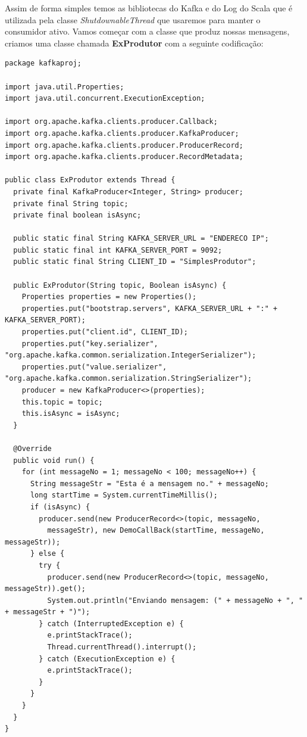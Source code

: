 \documentclass[a4paper,11pt]{article}
\begin{document}
Assim de forma simples temos as bibliotecas do Kafka e do Log do Scala que é utilizada pela classe \textit{ShutdownableThread} que usaremos para manter o consumidor ativo. Vamos começar com a classe que produz nossas mensagens, criamos uma classe chamada \textbf{ExProdutor} com a seguinte codificação:
\begin{lstlisting}[]
package kafkaproj;

import java.util.Properties;
import java.util.concurrent.ExecutionException;

import org.apache.kafka.clients.producer.Callback;
import org.apache.kafka.clients.producer.KafkaProducer;
import org.apache.kafka.clients.producer.ProducerRecord;
import org.apache.kafka.clients.producer.RecordMetadata;
 
public class ExProdutor extends Thread {
  private final KafkaProducer<Integer, String> producer;
  private final String topic;
  private final boolean isAsync;
 
  public static final String KAFKA_SERVER_URL = "ENDERECO IP";
  public static final int KAFKA_SERVER_PORT = 9092;
  public static final String CLIENT_ID = "SimplesProdutor";
 
  public ExProdutor(String topic, Boolean isAsync) {
    Properties properties = new Properties();
    properties.put("bootstrap.servers", KAFKA_SERVER_URL + ":" + KAFKA_SERVER_PORT);
    properties.put("client.id", CLIENT_ID);
    properties.put("key.serializer", "org.apache.kafka.common.serialization.IntegerSerializer");
    properties.put("value.serializer", "org.apache.kafka.common.serialization.StringSerializer");
    producer = new KafkaProducer<>(properties);
    this.topic = topic;
    this.isAsync = isAsync;
  }
 
  @Override
  public void run() {
    for (int messageNo = 1; messageNo < 100; messageNo++) {
      String messageStr = "Esta é a mensagem no." + messageNo;
      long startTime = System.currentTimeMillis();
      if (isAsync) {
        producer.send(new ProducerRecord<>(topic, messageNo,
          messageStr), new DemoCallBack(startTime, messageNo, messageStr));
      } else {
        try {
          producer.send(new ProducerRecord<>(topic, messageNo, messageStr)).get();
          System.out.println("Enviando mensagem: (" + messageNo + ", " + messageStr + ")");
        } catch (InterruptedException e) {
          e.printStackTrace();
          Thread.currentThread().interrupt();
        } catch (ExecutionException e) {
          e.printStackTrace();
        }
      }
    }
  }
}
 

\end{lstlisting}
\end{document}
